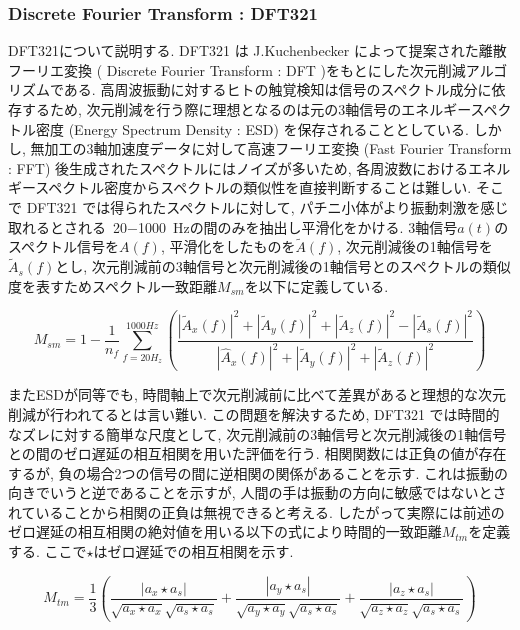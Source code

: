 \subsubsection{Discrete Fourier Transform : DFT321}
DFT321\cite{dft321}について説明する. DFT321 は J.Kuchenbecker によって提案された離散フーリエ変換 ( Discrete Fourier Transform : DFT )をもとにした次元削減アルゴリズムである. 
高周波振動に対するヒトの触覚検知は信号のスペクトル成分に依存する\cite{dft321}ため, 次元削減を行う際に理想となるのは元の3軸信号のエネルギースペクトル密度 (Energy Spectrum Density : ESD) を保存されることとしている. しかし, 無加工の3軸加速度データに対して高速フーリエ変換 (Fast Fourier Transform : FFT) 後生成されたスペクトルにはノイズが多いため, 各周波数におけるエネルギースペクトル密度からスペクトルの類似性を直接判断することは難しい. そこで DFT321 では得られたスペクトルに対して, パチニ小体がより振動刺激を感じ取れるとされる\, 20$-$1000\, $\mathrm{Hz}$の間のみを抽出し平滑化をかける. 3軸信号${a(t)}$のスペクトル信号を${{A}(f)}$, 平滑化をしたものを${\tilde{A}(f)}$, 次元削減後の1軸信号を${\tilde{A}_{s}(f)}$とし, 次元削減前の3軸信号と次元削減後の1軸信号とのスペクトルの類似度を表すためスペクトル一致距離${M_{sm}}$を以下に定義している. 

\begin{equation}
{M_{s m}=1-\frac{1}{n_{f}} \sum_{f=20 H_{z}}^{1000 H z}\left(\frac{\left|\tilde{A}_{x}(f)\right|^{2}+\left|\tilde{A}_{y}(f)\right|^{2}+\left|\tilde{A}_{z}(f)\right|^{2}-\left|\tilde{A}_{s}(f)\right|^{2}}{\left|\hat{A}_{x}(f)\right|^{2}+\left|\tilde{A}_{y}(f)\right|^{2}+\left|\tilde{A}_{z}(f)\right|^{2}}\right)}
\end{equation}


またESDが同等でも, 時間軸上で次元削減前に比べて差異があると理想的な次元削減が行われてるとは言い難い. この問題を解決するため, DFT321 では時間的なズレに対する簡単な尺度として, 次元削減前の3軸信号と次元削減後の1軸信号との間のゼロ遅延の相互相関を用いた評価を行う. 相関関数には正負の値が存在するが, 負の場合2つの信号の間に逆相関の関係があることを示す. これは振動の向きでいうと逆であることを示すが, 人間の手は振動の方向に敏感ではないとされていることから相関の正負は無視できると考える. したがって実際には前述のゼロ遅延の相互相関の絶対値を用いる以下の式により時間的一致距離${M_{tm}}$を定義する. ここで$\star$はゼロ遅延での相互相関を示す. 

\begin{equation}
{M_{t m}=\frac{1}{3}\left(\frac{\left|a_{x} \star a_{s}\right|}{\sqrt{a_{x} \star a_{x}} \sqrt{a_{s} \star a_{s}}}+\frac{\left|a_{y} \star a_{s}\right|}{\sqrt{a_{y} \star a_{y}} \sqrt{a_{s} \star a_{s}}}+\frac{\left|a_{z} \star a_{s}\right|}{\sqrt{a_{z} \star a_{z}} \sqrt{a_{s} \star a_{s}}}\right)}
\end{equation}



